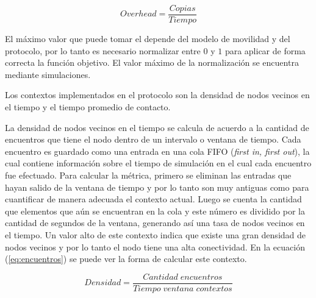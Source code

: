 \begin{equation}
  Overhead = \frac{Copias}{Tiempo}
  \label{eq:overhead_tiempo}
\end{equation}


El máximo valor que puede tomar el \overhead{} depende del modelo de movilidad y
del protocolo, por lo tanto es necesario normalizar entre $0$ y $1$ para aplicar
de forma correcta la función objetivo. El valor máximo de la normalización se
encuentra mediante simulaciones.





Los contextos implementados en el protocolo son la densidad de nodos vecinos en
el tiempo y el tiempo promedio de contacto.

La densidad de nodos vecinos en el tiempo se calcula de acuerdo a la cantidad de
encuentros que tiene el nodo dentro de un intervalo o ventana de tiempo. Cada
encuentro es guardado como una entrada en una cola FIFO (\textit{first in, first
out}), la cual contiene información sobre el tiempo de simulación en el cual
cada encuentro fue efectuado. Para calcular la métrica, primero se eliminan las
entradas que hayan salido de la ventana de tiempo y por lo tanto son muy
antiguas como para cuantificar de manera adecuada el contexto actual. Luego se
cuenta la cantidad que elementos que aún se encuentran en la cola y este número
es dividido por la cantidad de segundos de la ventana, generando así una tasa de
nodos vecinos en el tiempo. Un valor alto de este contexto indica que existe una
gran densidad de nodos vecinos y por lo tanto el nodo tiene una alta
conectividad.  En la ecuación (\ref{eq:encuentros}) se puede ver la forma de
calcular este contexto.

\begin{equation}
  Densidad = \frac{Cantidad \; encuentros}{Tiempo \; ventana \; contextos}
  \label{eq:encuentros}
\end{equation}


